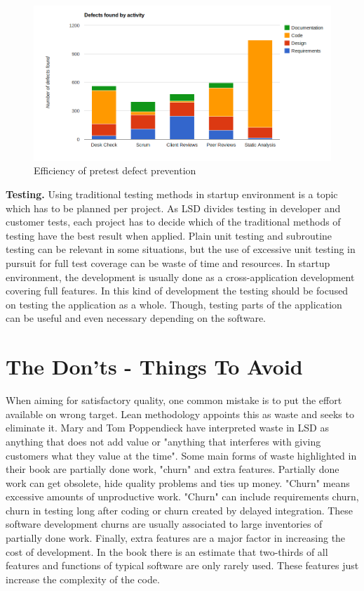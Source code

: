 \begin{figure}[t]
\begin{center}
\includegraphics[width=1.0\textwidth]{image/pretest-efficiency.png}
\end{center}
\caption{Efficiency of pretest defect prevention}
\label{fig:pretest-efficiency}
\end{figure}


\textbf{Testing.} Using traditional testing methods in startup environment is a topic which has to be planned per project. As LSD divides testing in developer and customer tests, each project has to decide which of the traditional methods of testing have the best result when applied. Plain unit testing and subroutine testing can be relevant in some situations, but the use of excessive unit testing in pursuit for full test coverage can be waste of time and resources. In startup environment, the development is usually done as a cross-application development covering full features. In this kind of development the testing should be focused on testing the application as a whole. Though, testing parts of the application can be useful and even necessary depending on the software.

\section{The Don'ts - Things To Avoid}

When aiming for satisfactory quality, one common mistake is to put the effort available on wrong target. Lean methodology appoints this as waste and seeks to eliminate it. Mary and Tom Poppendieck have interpreted waste in LSD as anything that does not add value or "anything that interferes with giving customers what they value at the time". Some main forms of waste highlighted in their book are partially done work, "churn" and extra features. Partially done work can get obsolete, hide quality problems and ties up money. "Churn" means excessive amounts of unproductive work. "Churn" can include requirements churn, churn in testing long after coding or churn created by delayed integration. These software development churns are usually associated to large inventories of partially done work. Finally, extra features are a major factor in increasing the cost of development. In the book there is an estimate that two-thirds of all features and functions of typical software are only rarely used. These features just increase the complexity of the code.~\cite{poppendieck2006implementing} 

